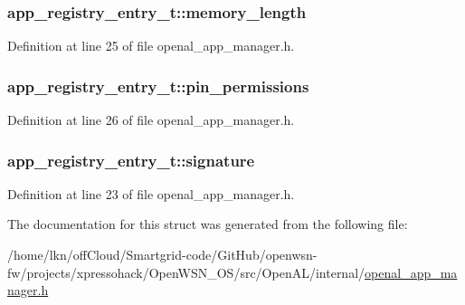 \subsubsection[{\texorpdfstring{memory\+\_\+length}{memory_length}}]{ app\+\_\+registry\+\_\+entry\+\_\+t\+::memory\+\_\+length}\hypertarget{structapp__registry__entry__t_a395de2eff78c8ee5bd2fdd0569b9b07b}{}\label{structapp__registry__entry__t_a395de2eff78c8ee5bd2fdd0569b9b07b}


Definition at line 25 of file openal\+\_\+app\+\_\+manager.\+h.

\subsubsection[{\texorpdfstring{pin\+\_\+permissions}{pin_permissions}}]{ app\+\_\+registry\+\_\+entry\+\_\+t\+::pin\+\_\+permissions}\hypertarget{structapp__registry__entry__t_a6e2d150670335817afab43fff811d2f1}{}\label{structapp__registry__entry__t_a6e2d150670335817afab43fff811d2f1}


Definition at line 26 of file openal\+\_\+app\+\_\+manager.\+h.

\subsubsection[{\texorpdfstring{signature}{signature}}]{ app\+\_\+registry\+\_\+entry\+\_\+t\+::signature}\hypertarget{structapp__registry__entry__t_abecd42cb47026b58e244924b703a2aae}{}\label{structapp__registry__entry__t_abecd42cb47026b58e244924b703a2aae}


Definition at line 23 of file openal\+\_\+app\+\_\+manager.\+h.



The documentation for this struct was generated from the following file\+:\begin{DoxyCompactItemize}
\item 
/home/lkn/off\+Cloud/\+Smartgrid-\/code/\+Git\+Hub/openwsn-\/fw/projects/xpressohack/\+Open\+W\+S\+N\+\_\+\+O\+S/src/\+Open\+A\+L/internal/\hyperlink{openal__app__manager_8h}{openal\+\_\+app\+\_\+manager.\+h}\end{DoxyCompactItemize}

